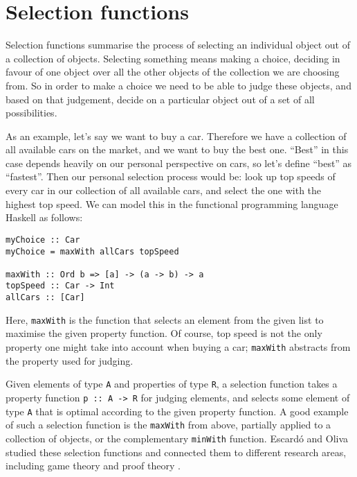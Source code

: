 \documentclass[runningheads]{llncs}
\begin{document}
\section{Selection functions}
\label{Selection functions}
Selection functions summarise the process of selecting an individual object out of a collection of objects. Selecting something means making a choice, deciding in favour of one object over all the other objects of the collection we are choosing from. So in order to make a choice we need to be able to judge these objects, and based on that judgement, decide on a particular object out of a set of all possibilities.

As an example, let's say we want to buy a car. Therefore we have a collection of all available cars on the market, and we want to buy the best one. ``Best'' in this case depends heavily on our personal perspective on cars, so let's define ``best'' as ``fastest''. Then our personal selection process would be: look up top speeds of every car in our collection of all available cars, and select the one with the highest top speed. We can model this in the functional programming language Haskell as follows:
\begin{verbatim}
myChoice :: Car
myChoice = maxWith allCars topSpeed 

maxWith :: Ord b => [a] -> (a -> b) -> a
topSpeed :: Car -> Int
allCars :: [Car]
\end{verbatim}
Here, \texttt{maxWith} is the function that selects an element from the given list to maximise the given property function. 
Of course, top speed is not the only property one might take into account when buying a car; \texttt{maxWith} abstracts from the property used for judging.

Given elements of type \texttt{A} and properties of type \texttt{R}, a selection function takes a property function \texttt{p :: A -> R} for judging elements, and selects some element of type \texttt{A} that is optimal according to the given property function.
A good example of such a selection function is the \texttt{maxWith} from above, partially applied to a collection of objects, or the complementary \texttt{minWith} function.
Escardó and Oliva studied these selection functions and connected them to different research areas, including game theory and proof theory \cite{escardo2010sequential}.
%
%
%
\end{document}
